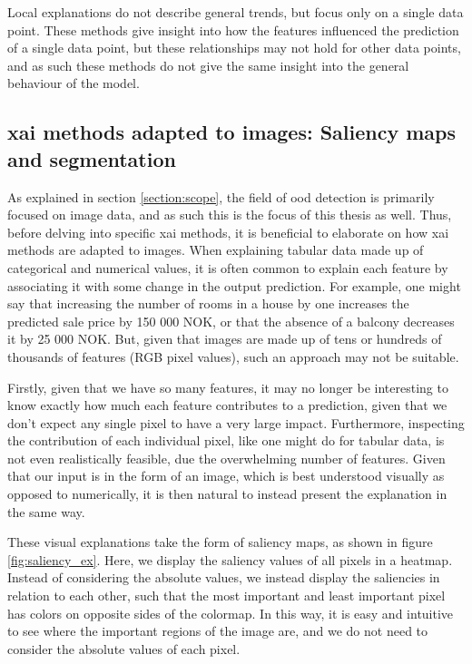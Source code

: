 \documentclass[UKenglish]{uiomasterthesis} %
\theoremstyle{definition}
\begin{document}
Local explanations do not describe general trends, but focus only on a single data point. These methods give insight into how the features influenced the prediction of a single data point, but these relationships may not hold for other data points, and as such these methods do not give the same insight into the general behaviour of the model.

%

\subsection{\ac{xai} methods adapted to images: Saliency maps and segmentation} \label{section:saliencymapbackground}


As explained in section \ref{section:scope}, the field of \ac{ood} detection is primarily focused on image data, and as such this is the focus of this thesis as well. Thus, before delving into specific \ac{xai} methods, it is beneficial to elaborate on how \ac{xai} methods are adapted to images. When explaining tabular data made up of categorical and numerical values, it is often common to explain each feature by associating it with some change in the output prediction. For example, one might say that increasing the number of rooms in a house by one increases the predicted sale price by 150 000 NOK, or that the absence of a balcony decreases it by 25 000 NOK. But, given that images are made up of tens or hundreds of thousands of features (RGB pixel values), such an approach may not be suitable.

Firstly, given that we have so many features, it may no longer be interesting to know exactly how much each feature contributes to a prediction, given that we don't expect any single pixel to have a very large impact. Furthermore, inspecting the contribution of each individual pixel, like one might do for tabular data, is not even realistically feasible, due the overwhelming number of features. Given that our input is in the form of an image, which is best understood visually as opposed to numerically, it is then natural to instead present the explanation in the same way.

These visual explanations take the form of saliency maps, as shown in figure \ref{fig:saliency_ex}. Here, we display the saliency values of all pixels in a heatmap. Instead of considering the absolute values, we instead display the saliencies in relation to each other, such that the most important and least important pixel has colors on opposite sides of the colormap. In this way, it is easy and intuitive to see where the important regions of the image are, and we do not need to consider the absolute values of each pixel.
\end{document}
